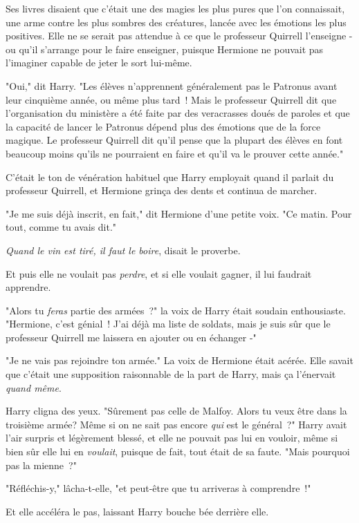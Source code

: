 Ses livres disaient que c'était une des magies les plus pures que l'on connaissait, une arme contre les plus sombres des créatures, lancée avec les émotions les plus positives. Elle ne se serait pas attendue à ce que le professeur Quirrell l'enseigne - ou qu'il s'arrange pour le faire enseigner, puisque Hermione ne pouvait pas l'imaginer capable de jeter le sort lui-même.

"Oui," dit Harry. "Les élèves n'apprennent généralement pas le Patronus avant leur cinquième année, ou même plus tard~! Mais le professeur Quirrell dit que l'organisation du ministère a été faite par des veracrasses doués de paroles et que la capacité de lancer le Patronus dépend plus des émotions que de la force magique. Le professeur Quirrell dit qu'il pense que la plupart des élèves en font beaucoup moins qu'ils ne pourraient en faire et qu'il va le prouver cette année."

C'était le ton de vénération habituel que Harry employait quand il parlait du professeur Quirrell, et Hermione grinça des dents et continua de marcher.

"Je me suis déjà inscrit, en fait," dit Hermione d'une petite voix. "Ce matin. Pour tout, comme tu avais dit."

\emph{Quand le vin est tiré, il faut le boire}, disait le proverbe.

Et puis elle ne voulait pas \emph{perdre}, et si elle voulait gagner, il lui faudrait apprendre.

"Alors tu \emph{feras} partie des armées~?" la voix de Harry était soudain enthousiaste. "Hermione, c'est génial~! J'ai déjà ma liste de soldats, mais je suis sûr que le professeur Quirrell me laissera en ajouter ou en échanger -"

"Je ne vais pas rejoindre ton armée." La voix de Hermione était acérée. Elle savait que c'était une supposition raisonnable de la part de Harry, mais ça l'énervait \emph{quand même}.

Harry cligna des yeux. "Sûrement pas celle de Malfoy. Alors tu veux être dans la troisième armée? Même si on ne sait pas encore \emph{qui} est le général~?" Harry avait l'air surpris et légèrement blessé, et elle ne pouvait pas lui en vouloir, même si bien sûr elle lui en \emph{voulait}, puisque de fait, tout était de sa faute. "Mais pourquoi pas la mienne~?"

"Réfléchis-y," lâcha-t-elle, "et peut-être que tu arriveras à comprendre~!"

Et elle accéléra le pas, laissant Harry bouche bée derrière elle.

